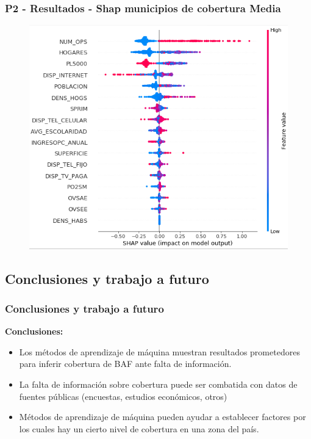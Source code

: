 \documentclass[xcolor=dvipsnames, compress]{beamer}
\begin{document}
\begin{frame}
\frametitle{P2 - Resultados - Shap municipios de cobertura Media}
\begin{figure}
\includegraphics[scale=0.45]{images/p2_results_shap.png}
\end{figure}
\end{frame}


\begin{frame}
\section{Conclusiones y trabajo a futuro}
\frametitle{Conclusiones y trabajo a futuro}

		\textbf{Conclusiones:}
		\begin{itemize}
			\item Los métodos de aprendizaje de máquina muestran resultados prometedores para inferir cobertura de BAF ante falta de información.
			\item La falta de información sobre cobertura puede ser combatida con datos de fuentes públicas (encuestas, estudios económicos, otros)
			\item Métodos de aprendizaje de máquina pueden ayudar a establecer factores por los cuales hay un cierto nivel de cobertura en una zona del país.

		\end{itemize}

\end{frame}
\end{document}
